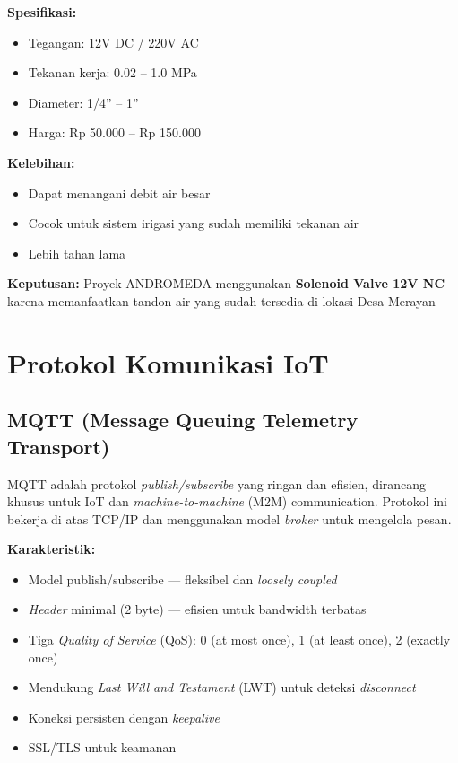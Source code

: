 \documentclass[12pt,a4paper,oneside]{report}
\begin{document}
\textbf{Spesifikasi:}
\begin{itemize}
    \item Tegangan: 12V DC / 220V AC
    \item Tekanan kerja: 0.02 -- 1.0 MPa
    \item Diameter: 1/4'' -- 1''
    \item Harga: Rp 50.000 -- Rp 150.000
\end{itemize}

\textbf{Kelebihan:}
\begin{itemize}
    \item Dapat menangani debit air besar
    \item Cocok untuk sistem irigasi yang sudah memiliki tekanan air
    \item Lebih tahan lama
\end{itemize}

\textbf{Keputusan:} Proyek ANDROMEDA menggunakan \textbf{Solenoid Valve 12V NC} karena memanfaatkan tandon air yang sudah tersedia di lokasi Desa Merayan

\section{Protokol Komunikasi IoT}

\subsection{MQTT (Message Queuing Telemetry Transport)}

MQTT adalah protokol \textit{publish/subscribe} yang ringan dan efisien, dirancang khusus untuk IoT dan \textit{machine-to-machine} (M2M) communication. Protokol ini bekerja di atas TCP/IP dan menggunakan model \textit{broker} untuk mengelola pesan.

\textbf{Karakteristik:}
\begin{itemize}
    \item Model publish/subscribe — fleksibel dan \textit{loosely coupled}
    \item \textit{Header} minimal (2 byte) — efisien untuk bandwidth terbatas
    \item Tiga \textit{Quality of Service} (QoS): 0 (at most once), 1 (at least once), 2 (exactly once)
    \item Mendukung \textit{Last Will and Testament} (LWT) untuk deteksi \textit{disconnect}
    \item Koneksi persisten dengan \textit{keepalive}
    \item SSL/TLS untuk keamanan
\end{itemize}
\end{document}
